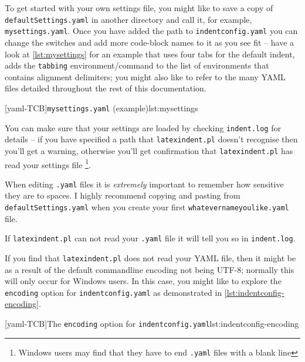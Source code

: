  To get started with your own settings file, you might like to save a copy of
 \texttt{defaultSettings.yaml} in another directory and call it, for example,
 \texttt{mysettings.yaml}. Once you have added the path to \texttt{indentconfig.yaml} you
 can change the switches and add more code-block names to it as you see fit -- have a
 look at \cref{lst:mysettings} for an example that uses four tabs for the default indent,
 adds the \texttt{tabbing} environment/command to the list of environments that contains
 alignment delimiters; you might also like to refer to the many YAML files detailed
 throughout the rest of this documentation. 

 [yaml-TCB]{\texttt{mysettings.yaml} (example)}{lst:mysettings}

 You can make sure that your settings are loaded by checking \texttt{indent.log} for
 details -- if you have specified a path that \texttt{latexindent.pl} doesn't recognise
 then you'll get a warning, otherwise you'll get confirmation that
 \texttt{latexindent.pl} has read your settings file \footnote{Windows users may find
 that they have to end \texttt{.yaml} files with a blank line}. 

 \begin{warning}
  When editing \texttt{.yaml} files it is \emph{extremely} important to remember how
  sensitive they are to spaces. I highly recommend copying and pasting from
  \texttt{defaultSettings.yaml} when you create your first
  \texttt{whatevernameyoulike.yaml} file.

  If \texttt{latexindent.pl} can not read your \texttt{.yaml} file it will tell you so in
  \texttt{indent.log}.
 \end{warning}

 If you find that 
 \texttt{latexindent.pl} does not read your YAML file, then it might be as a result of
 the default commandline encoding not being UTF-8; normally this will only occur for
 Windows users. In this case, you might like to explore the \texttt{encoding} option for
 \texttt{indentconfig.yaml} as demonstrated in \cref{lst:indentconfig-encoding}.%

 [yaml-TCB]{The \texttt{encoding} option for \texttt{indentconfig.yaml}}{lst:indentconfig-encoding}

